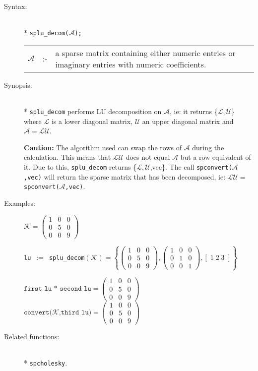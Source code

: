 \begin{description}
\item[Syntax:]\mbox{}\\*
\texttt{splu\_decom($\mathcal{A}$);}\\[2mm]
\begin{tabular}{l l p{.848\linewidth}}
$\mathcal{A}$ &:-& a sparse matrix containing either
numeric entries or imaginary entries with numeric coefficients.
\end{tabular}

\item[Synopsis:]\mbox{}\\*
              \texttt{splu\_decom} performs LU decomposition on $\mathcal{A}$,
              ie: it returns \{$\mathcal{L,U}$\} where $\mathcal{L}$
              is a lower diagonal matrix, $\mathcal{U}$ an upper diagonal
              matrix and $\mathcal{A} = \mathcal{LU}$.

\textbf{Caution:}
The algorithm used can swap the rows of $\mathcal{A}$
                during the calculation. This means that $\mathcal{LU}$ does
                not equal $\mathcal{A}$ but a row equivalent of it. Due to
                this, \texttt{splu\_decom} returns \{$\mathcal{L,U}$,vec\}. The
                call \texttt{spconvert($\mathcal{A}$,vec)} will return the
                sparse matrix that has been decomposed, ie: $\mathcal{LU} = $
                \texttt{spconvert($\mathcal{A}$,vec)}.

\item[Examples:]
\(
\mathcal{K} = \begin{pmatrix} 1 & 0 & 0 \\ 0 & 5 & 0 \\ 0 & 0 & 9 \end{pmatrix}
\)

\texttt{lu}\ $:=$\ \texttt{splu\_decom}\((\mathcal{K}) =
\left\{
        \begin{pmatrix} 1 & 0 & 0 \\ 0 & 5 & 0 \\ 0 & 0 & 9 \end{pmatrix},
        \begin{pmatrix} 1 & 0 & 0 \\ 0 & 1 & 0 \\ 0 & 0 & 1 \end{pmatrix},
	[\; 1 \; 2 \; 3 \; ]
\right\}
\)

\(\texttt{first lu * second lu} =
        \begin{pmatrix} 1 & 0 & 0 \\ 0 & 5 & 0 \\ 0 & 0 & 9 \end{pmatrix}\) \\[2mm]
\(\texttt{convert($\mathcal{K}$,third lu}) =
        \begin{pmatrix} 1 & 0 & 0 \\ 0 & 5 & 0 \\ 0 & 0 & 9 \end{pmatrix}\)

\item[Related functions:]\mbox{}\\*
 \texttt{spcholesky}.
\end{description}

